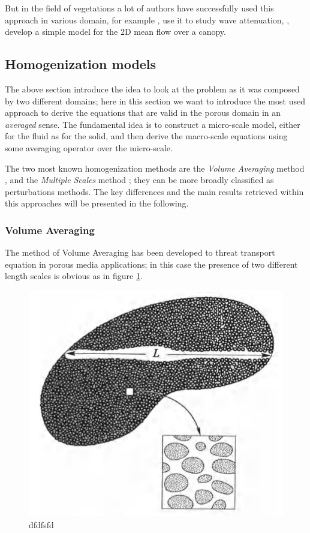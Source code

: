 But in the field of vegetations a lot of authors have successfully used this approach in various domain, for example \citet{maza2013coupled}, \citet{maza2015tsunami} use it to study wave attenuation, \citet{ghisalberti2004limited}, \citet{battiato2014single} develop a simple model for the 2D mean flow over a canopy.


\subsection{Homogenization models}

The above section introduce the idea to look at the problem as it was composed by two different domains; here in this section we want to introduce the most used approach to derive the equations that are valid in the porous domain in an \textit{averaged} sense.
The fundamental idea is to construct a micro-scale model, either for the fluid as for the solid, and then derive the macro-scale equations using some averaging operator over the micro-scale.

The two most known homogenization methods are the \textit{Volume Averaging} method \citet{whitaker2013method}, and the \textit{Multiple Scales} method \citet{mei2010homogenization}; they can be more broadly classified as perturbations methods. 
The key differences and the main results retrieved within this approaches will be presented in the following.


\subsubsection{Volume Averaging}
\label{sec:vans}

The method of Volume Averaging has been developed to threat transport equation in porous media applications; in this case the presence of two different length scales is obvious as in figure \ref{fig:porsystem}.
	
	\begin{figure}[h]
		\centering
		\includegraphics[width=0.7\linewidth]{chapter_1/por_system}
		\caption{dfdfsfd}
		\label{fig:porsystem}
	\end{figure}

